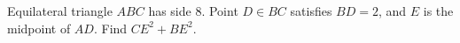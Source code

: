 Equilateral triangle $ABC$ has side 8. Point $D\in BC$ satisfies $BD=2$, and $E$ is the midpoint of $AD$. Find $CE^2+BE^2$.
